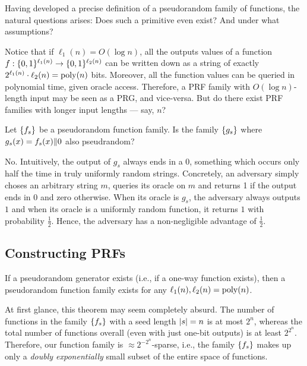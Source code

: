 \documentclass[11pt]{article}
\begin{document}
Having developed a precise definition of a pseudorandom family of
functions, the natural questions arises: Does such a primitive even
exist?  And under what assumptions?

Notice that if $\ell_{1}(n) = O(\log n)$, all the outputs values of a
function $f : \{0,1\}^{\ell_{1}(n)} \to \{0,1\}^{\ell_{2}(n)}$ can be
written down as a string of exactly $2^{\ell_{1}(n)} \cdot \ell_{2}(n)
= \operatorname{poly}(n)$ bits.  Moreover, all the function values can be queried in
polynomial time, given oracle access.  Therefore, a PRF family with
$O(\log n)$-length input may be seen as a PRG, and vice-versa.  But do
there exist PRF families with longer input lengths --- say, $n$?

\begin{question}
    Let \(\{f_s\}\) be a pseudorandom function family. Is the family
    \(\{g_s\}\) where \(g_s(x) = f_s(x) \| 0\) also pseudrandom?
\end{question}
  
\begin{answer}
    No. Intuitively, the output of \(g_s\) always ends in a 0, something which
    occurs only half the time in truly uniformly random strings. Concretely, an
    adversary simply choses an arbitrary string \(m\), queries its oracle on
    \(m\) and returns 1 if the output ends in 0 and zero otherwise. When its
    oracle is \(g_s\), the adversary always outputs \(1\) and when its oracle is
    a uniformly random function, it returns \(1\) with probability
    \(\frac{1}{2}\). Hence, the adversary has a non-negligible advantage of
    \(\frac{1}{2}\).
\end{answer}

\subsection{Constructing PRFs}
\label{sec:constructing-prfs}

\begin{theorem}
  \label{thm:prg-implies-prf}
  If a pseudorandom generator exists (i.e., if a one-way function
  exists), then a pseudorandom function family exists for any
  $\ell_{1}(n), \ell_{2}(n) = \operatorname{poly}(n)$.
\end{theorem}

At first glance, this theorem may seem completely absurd.  The number
of functions in the family $\{f_{s}\}$ with a seed length $\lvert s\rvert =
n$ is at most $2^n$, whereas the total number of functions overall
(even with just one-bit outputs) is at least $2^{2^{n}}$.  Therefore,
our function family is $\approx 2^{-2^{n}}$-sparse, i.e., the family
$\{f_s\}$ makes up only a \emph{doubly exponentially} small subset
of the entire space of functions.
\end{document}
